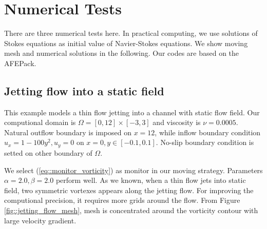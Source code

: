 \documentclass[a4paper, 11pt]{article}
\begin{document}
\section{Numerical Tests}
     There are three numerical tests here. In practical computing, 
     we use solutions of Stokes equations as initial value of
     Navier-Stokes equations.  We show moving mesh and numerical
     solutions in the following. Our codes are based on the AFEPack.

     \subsection{Jetting flow into a static field}
       This example models a thin flow jetting into a channel with
       static flow field.  
       Our computional domain is $\Omega = [0, 12] \times [-3, 3]$ and
       viscosity is $\nu = 0.0005$.
       Natural outflow boundary is imposed on $x = 12$, while inflow
       boundary condition $u_x = 1 - 100 y^2, u_y = 0$ on $x = 0, y
       \in [-0.1, 0.1]$. No-slip boundary condition is setted on
       other boundary of $\Omega$. 
       
       We select (\ref{eq::monitor_vorticity}) as monitor in our
       moving strategy. Parameters $\alpha = 2.0, \beta = 2.0$ perform
       well. As we known, when a thin flow jets into static
       field, two symmetric vortexes appears along the jetting flow.
       For improving the computional precision, it requires more grids
       around the flow. From Figure \ref{fig::jetting_flow_mesh}, mesh 
       is concentrated around the vorticity contour with large
       velocity gradient.
\end{document}
